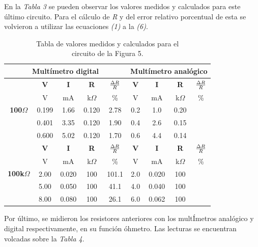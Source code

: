\documentclass{article}
\begin{document}
\noindent En la \textit{Tabla 3} se pueden observar los valores medidos y calculados para este último circuito. Para el cálculo de \textit{R} y del error relativo porcentual de esta se volvieron a utilizar las ecuaciones \textit{(1)} a la \textit{(6)}.
\bigskip\medskip


\begin{table}[!hbt]
	\begin{center}

		\begin{tabular}{|c|c|c|c|c|c|c|c|c|} \hline
			\multicolumn{5}{|c|}{\textbf{Multímetro digital}} & \multicolumn{4}{|c|}{\textbf{Multímetro analógico}} \\ \hline
			\multirow{5}{*}{\textbf{100$\Omega$}} 
			& \textbf{V} & \textbf{I} & \textbf{R} & \textbf{${\Delta R \over R}$} & \textbf{V} & \textbf{I} & \textbf{R} & \textbf{${\Delta R \over R}$} \\\cline{2-9}
			& V & mA & k$\Omega$ & \% & V & mA & k$\Omega$ & \% \\\cline{2-9}
			& 0.199 & 1.66 & 0.120 & 2.78 & 0.2 & 1.0 & 0.20 &  \\\cline{2-9}
			& 0.401 & 3.35 & 0.120 & 1.90 & 0.4 & 2.6 & 0.15 &  \\\cline{2-9}
			& 0.600 & 5.02 & 0.120 & 1.70 & 0.6 & 4.4 & 0.14 &  \\ \hline
			\multirow{5}{*}{\textbf{100k$\Omega$}} 
			& \textbf{V} & \textbf{I} & \textbf{R} & \textbf{${\Delta R \over R}$} & \textbf{V} & \textbf{I} & \textbf{R} & \textbf{${\Delta R \over R}$} \\\cline{2-9}
			& V & mA & k$\Omega$ & \% & V & mA & k$\Omega$ & \% \\\cline{2-9}
			& 2.00 & 0.020 & 100 & 101.1 & 2.0 & 0.020 & 100 &  \\\cline{2-9}
			& 5.00 & 0.050 & 100 & 41.1 & 4.0 & 0.040 & 100 &  \\\cline{2-9}
			& 8.00 & 0.080 & 100 & 26.1 & 6.0 & 0.062 & 100 &  \\ \hline
		\end{tabular}

	\caption{Tabla de valores medidos y calculados para el\\ circuito de la Figura 5.}
	\end{center}
\end{table}
\bigskip




	Por último, se midieron los resistores anteriores con los multÍmetros analógico y digital respectivamente, en su función óhmetro. Las lecturas se encuentran volcadas sobre la \textit{Tabla 4}.
\bigskip\bigskip
\end{document}
